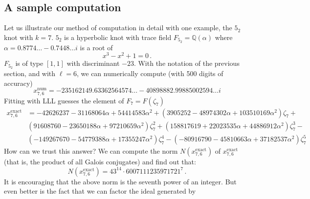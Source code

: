 \documentclass[12pt]{amsart}
\theoremstyle{definition}
\def\BQ{\mathbb Q}
\def\a{\alpha}
\def\b{\beta}
\begin{document}

\subsection{A sample computation}
\label{sub.sample}

Let us illustrate our method of computation in detail with one example, the
$5_2$ knot with $k=7$. $5_2$ is a hyperbolic knot with trace
field $F_{5_2}=\BQ(\a)$ where $\a=0.8774 \dots - 0.7448 \dots i $ is a root of 
$$
x^3 -x^2 + 1 = 0 \,.
$$
$F_{5_2}$ is of type $[1,1]$ with discriminant $-23$. With the notation of
the previous section, and with $\ell=6$, we can numerically compute
(with 500 digits of accuracy) 
$$
x^{\mathrm{num}}_{7,6}=
-235162149.63362564574 \dots - 40898882. 99885002594 \dots i
$$
Fitting with LLL guesses the element of $F_7=F(\zeta_7)$
{\small
\begin{align*}
x^{\mathrm{exact}}_{7,6} &=
 -42626237 - 31168064 \a + 54414583 \a^2 +  
   (3905252 - 48974302 \a + 103510169 \a^2)  \zeta_7 + \\ & 
   (91608760 - 23650188 \a + 97210659 \a^2)  \zeta_7^2 +  
   (158817619 + 22023535 \a + 44886912 \a^2)  \zeta_7^3 - \\ & 
   (-149267670 - 54779388 \a + 17355247 \a^2)  \zeta_7^4 - 
   (-80916790 - 45810663 \a + 37182537 \a^2)  \zeta_7^5
\end{align*}
}
How can we trust this answer? 
We can compute the norm $N(x^{\mathrm{exact}}_{7,6})$ of $x^{\mathrm{exact}}_{7,6}$
(that is, the product of all Galois conjugates) and find out that:
$$
N(x^{\mathrm{exact}}_{7,6}) = 43^{14} \cdot 6007111235971721^7 \,.
$$
It is encouraging that the above norm is the seventh power of an integer. 
But even better is the fact that we can factor the ideal generated by 
\end{document}
